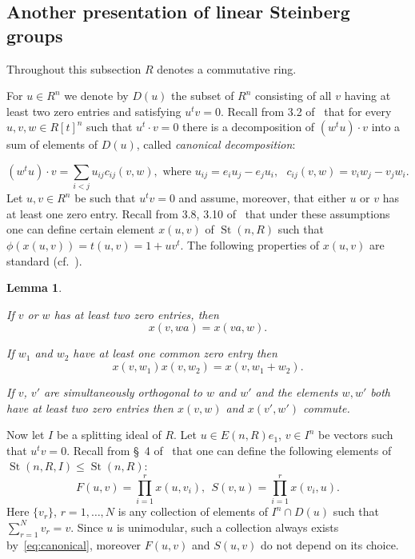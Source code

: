 \documentclass[oneside, 10pt]{amsart}
\DeclareMathOperator{\St}{St}
\numberwithin{equation}{section}
\newtheorem{lemma}{Lemma}
\numberwithin{lemma}{section}
\theoremstyle{definition}
\theoremstyle{remark}
\begin{document}
\subsection{Another presentation of linear Steinberg groups} \label{sec:another-presentation}
Throughout this subsection $R$ denotes a commutative ring.

For $u \in R^n$ we denote by $D(u)$ the subset of $R^n$ consisting of all $v$ having at least two zero entries and satisfying $u^tv = 0$.
Recall from 3.2 of~\cite{Ka77} that for every $u, v, w \in R[t]^n$ such that $u^t \cdot v = 0$ there
 is a decomposition of $(w^t u) \cdot v$ into a sum of elements of $D(u)$, called {\it canonical decomposition}:

\begin{equation} \label{eq:canonical} (w^tu) \cdot v=\sum_{i<j}u_{ij} c_{ij}(v, w),\text{ where $u_{ij}=e_iu_j-e_ju_i,$ $c_{ij}(v, w)=v_iw_j-v_jw_i.$}\end{equation}
Let $u, v \in R^n$ be such that $u^t v = 0$ and assume, moreover, that either $u$ or $v$ has at least one zero entry.
Recall from 3.8, 3.10 of~\cite{Ka77} that under these assumptions one can define certain element
 $x(u, v)$ of $\St(n, R)$ such that $\phi(x(u, v)) = t(u, v) = 1 + uv^t$.
The following properties of $x(u, v)$ are standard (cf.~\cite[Lemma~1.1]{Tu83}).
\begin{lemma} \label{lem:xsmall-properties}
\begin{lemlist}
 \item \label{item:xsmall-scalar} If $v$ or $w$ has at least two zero entries, then 
 \begin{equation}\nonumber x(v, wa) = x(va, w).\end{equation} %
 \item \label{item:xsmall-additivity} If $w_1$ and $w_2$ have at least one common zero entry then
 \begin{equation}\nonumber x(v, w_1)x(v, w_2) = x(v, w_1+w_2).\end{equation}
 \item \label{item:xsmall-commute} If $v$, $v'$ are simultaneously orthogonal to $w$ and $w'$ and the elements $w, w'$
  both have at least two zero entries then $x(v, w)$ and $x(v', w')$ commute.
\end{lemlist}
\end{lemma}

Now let $I$ be a splitting ideal of $R$.
Let $u \in E(n, R)e_1$, $v \in I^n$ be vectors such that $u^tv = 0$.
Recall from \S~4 of~\cite{LS17} that one can define the following elements of $\St(n, R, I) \leq \St(n, R)$:
\begin{equation} \label{eq:sigma-definition}
 F(u, v) = \prod\limits_{i=1}^r x(u,  v_i),\ \
 S(v, u) = \prod\limits_{i=1}^r x( v_i, u).
\end{equation}
Here $\{v_r\}$, $r=1,\ldots,N$ is any collection of elements of $I^n \cap D(u)$ such that $\sum_{r=1}^N v_r = v$.
Since $u$ is unimodular, such a collection always exists by~\eqref{eq:canonical}, moreover $F(u, v)$ and $S(u, v)$ do not depend on its choice. %
\end{document}
